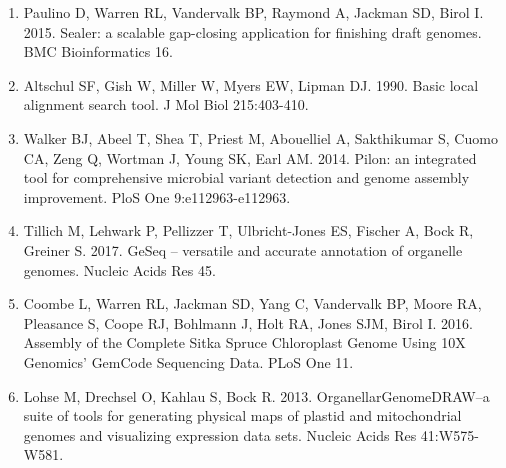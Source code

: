 \documentclass[titlepage,11pt, oneside]{article}   	%
\begin{document}
\begin{enumerate}
\item Paulino D, Warren RL, Vandervalk BP, Raymond A, Jackman SD, Birol I. 2015. Sealer: a scalable gap-closing application for finishing draft genomes. BMC Bioinformatics 16.
\item Altschul SF, Gish W, Miller W, Myers EW, Lipman DJ. 1990. Basic local alignment search tool. J Mol Biol 215:403-410.
\item Walker BJ, Abeel T, Shea T, Priest M, Abouelliel A, Sakthikumar S, Cuomo CA, Zeng Q, Wortman J, Young SK, Earl AM. 2014. Pilon: an integrated tool for comprehensive microbial variant detection and genome assembly improvement. PloS One 9:e112963-e112963.
\item Tillich M, Lehwark P, Pellizzer T, Ulbricht-Jones ES, Fischer A, Bock R, Greiner S. 2017. GeSeq – versatile and accurate annotation of organelle genomes. Nucleic Acids Res 45.
\item Coombe L, Warren RL, Jackman SD, Yang C, Vandervalk BP, Moore RA, Pleasance S, Coope RJ, Bohlmann J, Holt RA, Jones SJM, Birol I. 2016. Assembly of the Complete Sitka Spruce Chloroplast Genome Using 10X Genomics’ GemCode Sequencing Data. PLoS One 11.
\item Lohse M, Drechsel O, Kahlau S, Bock R. 2013. OrganellarGenomeDRAW--a suite of tools for generating physical maps of plastid and mitochondrial genomes and visualizing expression data sets. Nucleic Acids Res 41:W575-W581.
\end{enumerate}
\end{document}
